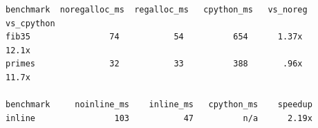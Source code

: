 \begin{lstlisting}[]
benchmark  noregalloc_ms  regalloc_ms   cpython_ms   vs_noreg vs_cpython
fib35                74           54          654      1.37x      12.1x
primes               32           33          388       .96x      11.7x

benchmark     noinline_ms    inline_ms   cpython_ms    speedup
inline                103           47          n/a      2.19x
\end{lstlisting}
